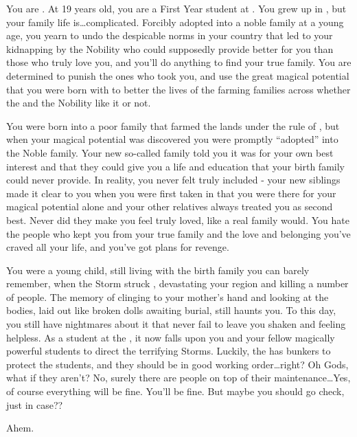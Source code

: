 \documentclass[char]{GL2020}
\begin{document}
\name{\cAdopted{}}

You are \cAdopted{}.  At 19 years old, you are a First Year student at \pSchool{}.  You grew up in \pFarm{}, but your family life is\ldots complicated.  Forcibly adopted into a noble family at a young age, you yearn to undo the despicable norms in your country that led to your kidnapping by the Nobility who could supposedly provide better for you than those who truly love you, and you'll do anything to find your true family. You are determined to punish the ones who took you, and use the great magical potential that you were born with to better the lives of the farming families across \pFarm{} whether the \cQueen{\Majesty} and the Nobility like it or not.

You were born into a poor family that farmed the lands under the rule of \cAdoptedParentOne{}, but when your magical potential was discovered you were promptly ``adopted'' into the Noble family.  Your new so-called family told you it was for your own best interest and that they could give you a life and education that your birth family could never provide.  In reality, you never felt truly included - your new siblings made it clear to you when you were first taken in that you were there for your magical potential alone and your other relatives always treated you as second best.  Never did they make you feel truly loved, like a real family would.  You hate the people who kept you from your true family and the love and belonging you’ve craved all your life, and you've got plans for revenge.  

You were a young child, still living with the birth family you can barely remember, when the Storm struck \pFarm{}, devastating your region and killing a number of people.  The memory of clinging to your mother’s hand and looking at the bodies, laid out like broken dolls awaiting burial, still haunts you.  To this day, you still have nightmares about it that never fail to leave you shaken and feeling helpless.  As a student at the \pSchool{}, it now falls upon you and your fellow magically powerful students to direct the terrifying Storms.  Luckily, the \pSchool{} has bunkers to protect the students, and they should be in good working order\ldots right?  Oh Gods, what if they aren't?  No, surely there are people on top of their maintenance\ldots Yes, of course everything will be fine. You'll be fine. But maybe you should go check, just in case??

Ahem.
\end{document}
